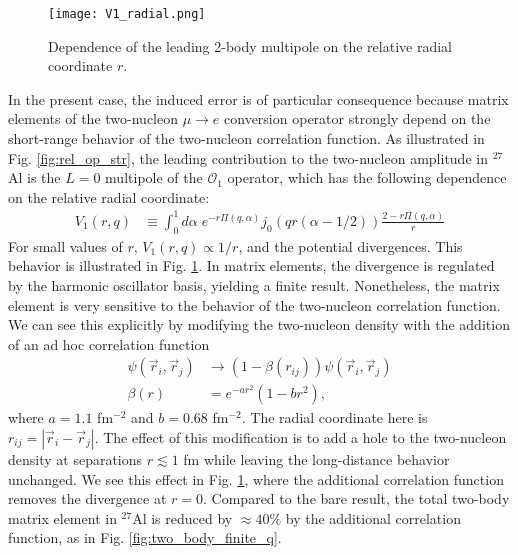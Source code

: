\documentclass[12pt,letterpaper]{book}
\begin{document}
\begin{figure}
\centering
\texttt{[image: V1\_radial.png]}
\caption{Dependence of the leading 2-body multipole on the relative radial coordinate $r$.}
\label{fig:V1_radial}
\end{figure}

In the present case, the induced error is of particular consequence because matrix elements of the two-nucleon $\mu\rightarrow e$ conversion operator strongly depend on the short-range behavior of the two-nucleon correlation function. As illustrated in Fig. \ref{fig:rel_op_str}, the leading contribution to the two-nucleon amplitude in $^{27}$Al is the $L=0$ multipole of the $\mathcal{O}_1$ operator, which has the following dependence on the relative radial coordinate:
\begin{equation}
\begin{split}
V_1(r,q)&\equiv \int_0^1d\alpha\;e^{-r\Pi(q,\alpha)}j_0(qr(\alpha-1/2))\frac{2-r\Pi(q,\alpha)}{r}
\end{split}
\end{equation}
For small values of $r$, $V_1(r,q)\propto 1/r$, and the potential divergences. This behavior is illustrated in Fig. \ref{fig:V1_radial}. In matrix elements, the divergence is regulated by the harmonic oscillator basis, yielding a finite result. Nonetheless, the matrix element is very sensitive to the behavior of the two-nucleon correlation function. We can see this explicitly by modifying the two-nucleon density with the addition of an ad hoc correlation function \cite{MILLER1976562}
\begin{equation}
\begin{split}
\psi(\vec{r}_i,\vec{r}_j)&\rightarrow\left(1-\beta(r_{ij})\right)\psi(\vec{r}_i,\vec{r}_j)\\
\beta(r)&=e^{-ar^2}\left(1-br^2\right),
\label{eq:f_corr}
\end{split}
\end{equation}
where $a=1.1$ fm$^{-2}$ and $b=0.68$ fm$^{-2}$. The radial coordinate here is $r_{ij}=|\vec{r}_i-\vec{r}_j|$. The effect of this modification is to add a hole to the two-nucleon density at separations $r\lesssim 1$ fm while leaving the long-distance behavior unchanged. We see this effect in Fig. \ref{fig:V1_radial}, where the additional correlation function removes the divergence at $r=0$. Compared to the bare result, the total two-body matrix element in $^{27}$Al is reduced by $\approx 40\%$ by the additional correlation function, as in Fig. \ref{fig:two_body_finite_q}. 
\end{document}
